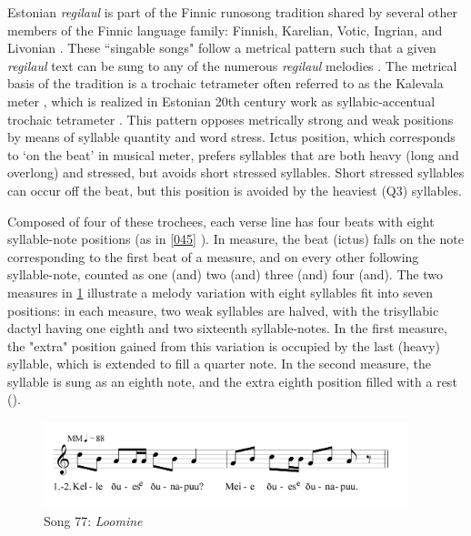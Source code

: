 Estonian {\it regilaul} is part of the Finnic runosong tradition shared by several other members of the Finnic language family: Finnish, Karelian, Votic, Ingrian, and Livonian \citep{rossLehiste2001}. These ``singable songs" \citep{tormis1985} follow a metrical pattern such that a given {\it regilaul} text can be sung to any of the numerous {\it regilaul} melodies \citep{rossLehiste2001}. The metrical basis of the tradition is a trochaic tetrameter often referred to as the Kalevala meter \citep{oras2019}, which is realized in Estonian 20th century work as syllabic-accentual trochaic tetrameter \citep{lotmanLotman2013}. This pattern opposes metrically strong and weak positions by means of syllable quantity and word stress. Ictus position, which corresponds to `on the beat' in musical meter, prefers syllables that are both heavy (long and overlong) and stressed, but avoids short stressed syllables. Short stressed syllables can occur off the beat, but this position is avoided by the heaviest (Q3) syllables. 

Composed of four of these trochees, each verse line has four beats with eight syllable-note positions (as in  \ref{045} ). In   measure, the beat (ictus) falls on the note corresponding to the first beat of a measure, and on every other following syllable-note, counted as one (and) two (and) three (and) four (and).
The two measures in \ref{077} illustrate a melody variation with eight syllables fit into seven positions: in each measure, two weak syllables are halved, with the trisyllabic dactyl having one eighth and two sixteenth syllable-notes. In the first measure, the "extra" position gained from this variation is occupied by the last (heavy) syllable, which is extended to fill a quarter note. In the second measure, the syllable is sung as an eighth note, and the extra eighth position filled with a rest (\quaverRest). 


\begin{figure}[hb]
\begin{center}
\includegraphics[width=300pt]{figures/077.png}
\caption{Song 77: {\it Loomine}}
\label{077}
\end{center}
\end{figure}



